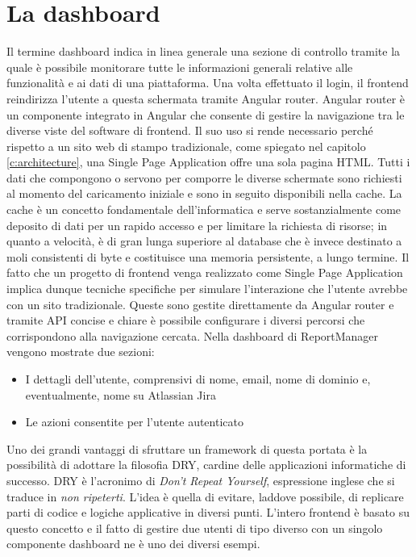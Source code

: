 \section{La dashboard}

Il termine dashboard indica in linea generale una sezione di controllo tramite la quale è possibile monitorare tutte le informazioni generali relative alle funzionalità e ai dati
di una piattaforma.
Una volta effettuato il login, il frontend reindirizza l'utente a questa schermata tramite Angular router.
Angular router è un componente integrato in Angular che consente di gestire la navigazione tra le diverse viste del software di frontend.
Il suo uso si rende necessario perché rispetto a un sito web di stampo tradizionale, come spiegato nel capitolo \ref{c:architecture}, una Single Page Application offre una sola 
pagina HTML.
Tutti i dati che compongono o servono per comporre le diverse schermate sono richiesti al momento del caricamento iniziale e sono in seguito disponibili nella cache.
La cache è un concetto fondamentale dell'informatica e serve sostanzialmente come deposito di dati per un rapido accesso e per limitare la richiesta di risorse; in quanto a velocità, 
è di gran lunga superiore al database che è invece destinato a moli consistenti di byte e costituisce una memoria persistente, a lungo termine.
Il fatto che un progetto di frontend venga realizzato come Single Page Application implica dunque tecniche specifiche per simulare l'interazione che l'utente avrebbe con un sito
tradizionale. Queste sono gestite direttamente da Angular router e tramite API concise e chiare è possibile configurare i diversi percorsi che corrispondono alla navigazione cercata.
Nella dashboard di ReportManager vengono mostrate due sezioni:
\begin{itemize}
    \item I dettagli dell'utente, comprensivi di nome, email, nome di dominio e, eventualmente, nome su Atlassian Jira
    \item Le azioni consentite per l'utente autenticato
\end{itemize}
Uno dei grandi vantaggi di sfruttare un framework di questa portata è la possibilità di adottare la filosofia DRY, cardine delle applicazioni informatiche di successo.
DRY è l'acronimo di \emph{Don't Repeat Yourself}, espressione inglese che si traduce in \emph{non ripeterti}.
L'idea è quella di evitare, laddove possibile, di replicare parti di codice e logiche applicative in diversi punti.
L'intero frontend è basato su questo concetto e il fatto di gestire due utenti di tipo diverso con un singolo componente dashboard ne è uno dei diversi esempi.
